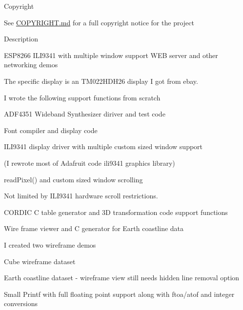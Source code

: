 \begin{DoxyParagraph}{Copyright}

\begin{DoxyItemize}
\item See \hyperlink{md_COPYRIGHT}{C\+O\+P\+Y\+R\+I\+G\+HT.md} for a full copyright notice for the project
\end{DoxyItemize}
\end{DoxyParagraph}
\begin{DoxyParagraph}{Description}

\begin{DoxyItemize}
\item E\+S\+P8266 I\+L\+I9341 with multiple window support W\+EB server and other networking demos
\begin{DoxyItemize}
\item The specific display is an T\+M022\+H\+D\+H26 display I got from ebay.
\end{DoxyItemize}
\item I wrote the following support functions from scratch
\begin{DoxyItemize}
\item A\+D\+F4351 Wideband Synthesizer diriver and test code
\item Font compiler and display code
\item I\+L\+I9341 display driver with multiple custom sized window support
\begin{DoxyItemize}
\item (I rewrote most of Adafruit code ili9341 graphics library)
\item read\+Pixel() and custom sized window scrolling
\item Not limited by I\+L\+I9341 hardware scroll restrictions.
\end{DoxyItemize}
\item C\+O\+R\+D\+IC C table generator and 3D transformation code support functions
\item Wire frame viewer and C generator for Earth coastline data
\begin{DoxyItemize}
\item I created two wireframe demos
\begin{DoxyItemize}
\item Cube wireframe dataset
\item Earth coastline dataset -\/ wireframe view still needs hidden line removal option
\end{DoxyItemize}
\end{DoxyItemize}
\item Small Printf with full floating point support along with ftoa/atof and integer conversions

\end{DoxyItemize}
\end{DoxyItemize}
\end{DoxyParagraph}
